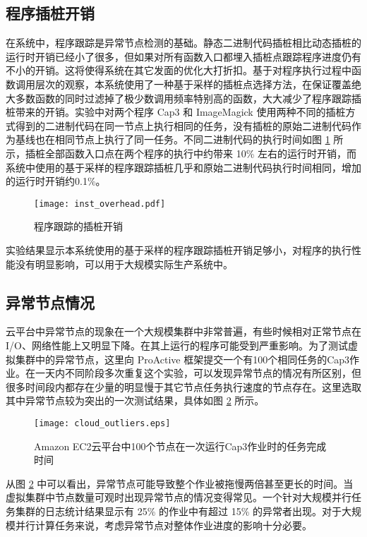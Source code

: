 \subsection{程序插桩开销}
\label{sec:no2_overhead}
在系统中，程序跟踪是异常节点检测的基础。静态二进制代码插桩相比动态插桩的运行时开销已经小了很多，但如果对所有函数入口都埋入插桩点跟踪程序进度仍有不小的开销。这将使得系统在其它发面的优化大打折扣。基于对程序执行过程中函数调用层次的观察，本系统使用了一种基于采样的插桩点选择方法，在保证覆盖绝大多数函数的同时过滤掉了极少数调用频率特别高的函数，大大减少了程序跟踪插桩带来的开销。实验中对两个程序 Cap3 和 ImageMagick 使用两种不同的插桩方式得到的二进制代码在同一节点上执行相同的任务，没有插桩的原始二进制代码作为基线也在相同节点上执行了同一任务。不同二进制代码的执行时间如图 \ref{figure:inst_overhead} 所示，插桩全部函数入口点在两个程序的执行中约带来 10\% 左右的运行时开销，而系统中使用的基于采样的程序跟踪插桩几乎和原始二进制代码执行时间相同，增加的运行时开销约0.1\%。

\begin{figure}
  \centering
  \texttt{[image: inst\_overhead.pdf]}
  \caption{程序跟踪的插桩开销}
  \label{figure:inst_overhead}
\end{figure}

实验结果显示本系统使用的基于采样的程序跟踪插桩开销足够小，对程序的执行性能没有明显影响，可以用于大规模实际生产系统中。

\subsection{异常节点情况}
云平台中异常节点的现象在一个大规模集群中非常普遍，有些时候相对正常节点在I/O、网络性能上又明显下降。在其上运行的程序可能受到严重影响。为了测试虚拟集群中的异常节点，这里向 ProActive 框架提交一个有100个相同任务的Cap3作业。在一天内不同阶段多次重复这个实验，可以发现异常节点的情况有所区别，但很多时间段内都存在少量的明显慢于其它节点任务执行速度的节点存在。这里选取其中异常节点较为突出的一次测试结果，具体如图 \ref{figure:outlier_cloud} 所示。
\begin{figure}
  \centering
  \texttt{[image: cloud\_outliers.eps]}
  \caption{Amazon EC2云平台中100个节点在一次运行Cap3作业时的任务完成时间}
  \label{figure:outlier_cloud}
\end{figure}

从图 \ref{figure:outlier_cloud} 中可以看出，异常节点可能导致整个作业被拖慢两倍甚至更长的时间。当虚拟集群中节点数量可观时出现异常节点的情况变得常见。一个针对大规模并行任务集群的日志统计结果显示有 25\% 的作业中有超过 15\% 的异常者出现。对于大规模并行计算任务来说，考虑异常节点对整体作业进度的影响十分必要。

